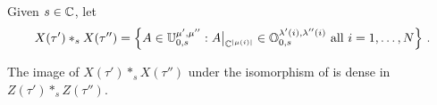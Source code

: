 \documentclass[draft]{article}
\begin{document}
Given $s\in\mathbb C$, let 
\begin{equation*}
    X(\tau')\ast_s X(\tau'') = \left\{A\in\mathbb U_{0,s}^{\mu',\mu''} : A \big|_{\mathbb C^{|\mu(i)|}} \in \mathbb O_{0,s}^{\lambda'(i),\lambda''(i)} \text{ all } i=1,\dots,N\right\}\,.
\end{equation*}
% 


\begin{proposition}
    The image of $X(\tau')\ast_s X(\tau'')$ under the isomorphism of  is dense in $Z(\tau')\ast_s Z(\tau'')$. 
\end{proposition}
% 

\end{document}
